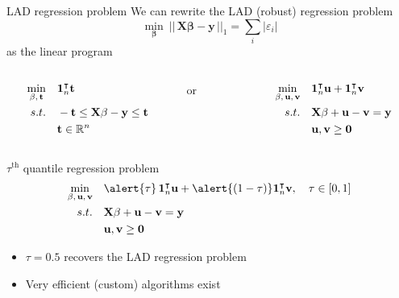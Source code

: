 \documentclass[12pt,aspectratio=169]{beamer}
\renewcommand{\vec}[1]{\ensuremath{\mathbf{#1}}}
\newcommand{\mat}[1]{\ensuremath{\vec{#1}}}
\newcommand{\tr}{\ensuremath{\intercal}}
\newcommand{\R}{\ensuremath{\mathbb{R}}}
\begin{document}
\begin{frame}{LAD regression problem}
    We can rewrite the LAD (robust) regression problem
    \[
        \min_{\vec{\beta}} \ \left|\left|\,\mat{X}\vec{\beta} - \vec{y}\,\right|\right|_{1}
        = \sum_{i} \left| \varepsilon_{i} \right|
    \]
    as the linear program
    \begin{columns}
        \begin{column}{0.475\textwidth}
            \begin{align*}
                \min_{\vec{\beta},\,\vec{t}} \quad& \vec{1}_{n}^{\tr} \vec{t} \\
                \mathnormal{s.t.}            \quad& -\vec{t} \leq \mat{X} \vec{\beta} - \vec{y} \leq \vec{t} \\
                                                  & \vec{t} \in \R^{n}
            \end{align*}
        \end{column}
        \begin{column}{0.05\textwidth}
            \centering%
            or
        \end{column}
        \begin{column}{0.475\textwidth}
            \begin{align*}
                \min_{\vec{\beta},\,\vec{u},\,\vec{v}} \quad& \vec{1}_{n}^{\tr} \vec{u} + \vec{1}_{n}^{\tr} \vec{v} \\
                \mathnormal{s.t.}                      \quad& \mat{X} \vec{\beta} + \vec{u} - \vec{v} = \vec{y} \\
                                                            & \vec{u}, \vec{v} \geq \vec{0}
            \end{align*}
        \end{column}
    \end{columns}
\end{frame}

\begin{frame}{$\tau^{\text{th}}$ quantile regression problem}
    \begin{align*}
        \min_{\vec{\beta},\,\vec{u},\,\vec{v}} \quad& \alert{\tau}\,\vec{1}_{n}^{\tr} \vec{u} + \alert{(1 - \tau)} \vec{1}_{n}^{\tr} \vec{v}, \quad \tau \in [0, 1] \\
        \mathnormal{s.t.}                      \quad& \mat{X} \vec{\beta} + \vec{u} - \vec{v} = \vec{y} \\
                                                    & \vec{u}, \vec{v} \geq \vec{0}
    \end{align*}
    \vfill
    \begin{itemize}
        \item $\tau = 0.5$ recovers the LAD regression problem
        \item Very efficient (custom) algorithms exist
    \end{itemize}
\end{frame}
\end{document}
